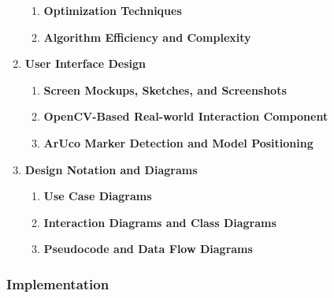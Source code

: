 \documentclass[12pt]{article}
\begin{document}
\begin{enumerate}
\begin{enumerate}
                  \item \textbf{Optimization Techniques}

                  \item \textbf{Algorithm Efficiency and Complexity}
            \end{enumerate}


      \item \textbf{User Interface Design}
            \begin{enumerate}
                  \item \textbf{Screen Mockups, Sketches, and Screenshots}

                  \item \textbf{OpenCV-Based Real-world Interaction Component}

                  \item \textbf{ArUco Marker Detection and Model Positioning}
            \end{enumerate}


      \item \textbf{Design Notation and Diagrams}
            \begin{enumerate}
                  \item \textbf{Use Case Diagrams}

                  \item \textbf{Interaction Diagrams and Class Diagrams}

                  \item \textbf{Pseudocode and Data Flow Diagrams}
            \end{enumerate}
\end{enumerate}

\subsubsection{Implementation}
\end{document}
